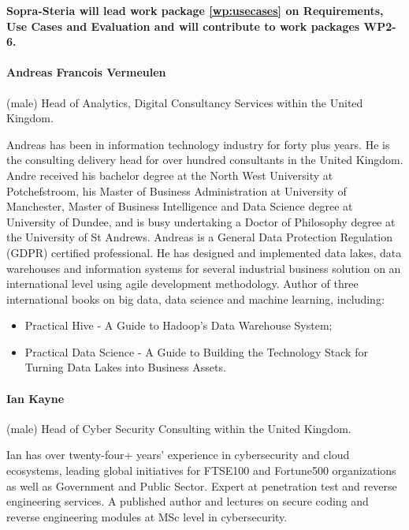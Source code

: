 \documentclass[a4paper,11pt]{article}
\begin{document}
\vspace{10pt}
\textbf{Sopra-Steria will lead work package \ref{wp:usecases} on Requirements, Use Cases and Evaluation and will contribute to work packages WP2-6.}

\vspace{10pt}

\paragraph{Andreas Francois Vermeulen} (male) Head of Analytics, Digital Consultancy Services within the United Kingdom.

Andreas has been in information technology industry for forty plus years. He is the consulting delivery head for over hundred consultants in the United Kingdom. Andre received his bachelor degree at the North West University at Potchefstroom, his Master of Business Administration at University of Manchester, Master of Business Intelligence and Data Science degree at University of Dundee, and is busy undertaking a Doctor of Philosophy degree at the University of St Andrews. Andreas is a General Data Protection Regulation (GDPR) certified professional. He has designed and implemented data lakes, data warehouses and information systems for several industrial business solution on an international level using agile development methodology. Author of three international books on big data, data science and machine learning, including:
\begin{itemize}
\item Practical Hive - A Guide to Hadoop’s Data Warehouse System;
\item Practical Data Science - A Guide to Building the Technology Stack for Turning Data Lakes into Business
Assets.
\end{itemize}

\paragraph{Ian Kayne} (male)  Head of Cyber Security Consulting within the United Kingdom.

Ian has over twenty-four+ years’ experience in cybersecurity and cloud ecosystems, leading global initiatives for FTSE100 and Fortune500 organizations as well as Government and Public Sector. Expert at penetration test and reverse engineering services. A published author and lectures on secure coding and reverse engineering modules at MSc level in cybersecurity.
\end{document}
